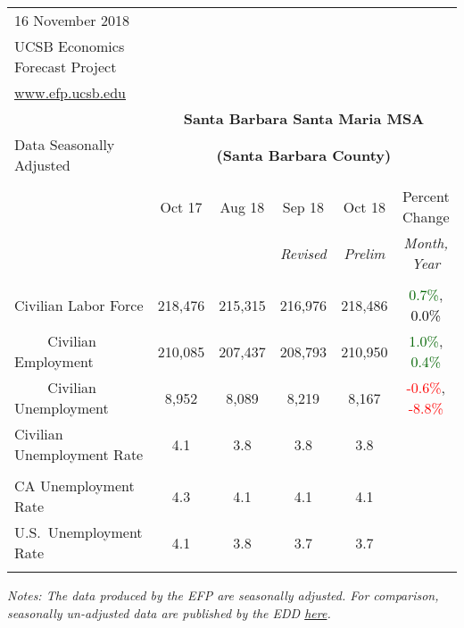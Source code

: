 \documentclass[12pt]{article}
\begin{document}
\begin{table}
\begin{tabular}{|l|c|c|c|c|c|}
\multicolumn{1}{l}{\small 16 November 2018} & \multicolumn{5}{c}{} \\
\multicolumn{1}{l}{\small UCSB Economics Forecast Project} & \multicolumn{5}{c}{} \\
\multicolumn{1}{l}{\small \href{http://www.efp.ucsb.edu/}{www.efp.ucsb.edu}} & \multicolumn{5}{c}{} \\
\multicolumn{1}{c}{} & \multicolumn{5}{c}{\large \textbf{Santa Barbara Santa Maria MSA}} \\
\multicolumn{1}{l}{\small Data Seasonally Adjusted} & \multicolumn{5}{c}{\small \textbf{(Santa Barbara County)}} \\ \hline \hline
& & & & & \\
 & Oct 17 & Aug 18 & Sep 18 & Oct 18 & Percent Change \\
 & & & \small \textit{Revised} & \small \textit{Prelim} & \small \textit{Month, Year} \\ \hline
& & & & & \\
Civilian Labor Force & 218,476 & 215,315 & 216,976 & 218,486 & \textcolor{darkgreen}{0.7\%}, \textcolor{black}{0.0\%} \\
$\qquad$ \small Civilian Employment & 210,085 & 207,437 & 208,793 & 210,950 & \textcolor{darkgreen}{1.0\%}, \textcolor{darkgreen}{0.4\%} \\
$\qquad$ \small Civilian Unemployment & 8,952 & 8,089 & 8,219 & 8,167 & \textcolor{red}{-0.6\%}, \textcolor{red}{-8.8\%} \\
Civilian Unemployment Rate & 4.1 & 3.8 & 3.8 & 3.8 & \\
& & & & & \\
CA Unemployment Rate & 4.3 & 4.1 & 4.1 & 4.1 & \\
U.S.\ Unemployment Rate & 4.1 & 3.8 & 3.7 & 3.7 & \\
& & & & & \\ \hline \hline
\end{tabular}
\par
\vspace{.5em}
\footnotesize
\textit{Notes: The data produced by the EFP are seasonally adjusted. For comparison, seasonally un-adjusted data are published by the EDD \href{http://www.labormarketinfo.ca.gov/file/lfmonth/satb$pds.pdf}{here}.}
\end{table}
\end{document}
